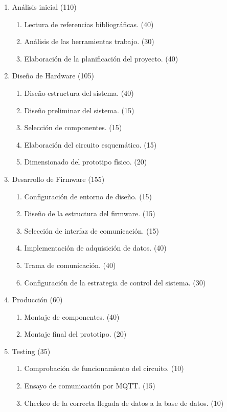 \documentclass[
11pt, %
codirector, %
]{charter}
\begin{document}
\begin{enumerate}
\item Análisis inicial (110)
	\begin{enumerate}
	\item Lectura de referencias bibliográficas. (40)
	\item Análisis de las herramientas trabajo. (30)
	\item Elaboración de la planificación del proyecto. (40)
	\end{enumerate}
\item Diseño de Hardware (105)
	\begin{enumerate}
	\item Diseño estructura del sistema. (40)
	\item Diseño preliminar del sistema. (15)
	\item Selección de componentes. (15)
	\item Elaboración del circuito esquemático. (15)
	\item Dimensionado del prototipo físico. (20)
	\end{enumerate}
\item Desarrollo de Firmware (155)
	\begin{enumerate}
	\item Configuración de entorno de diseño. (15)
	\item Diseño de la estructura del firmware. (15)
	\item Selección de interfaz de comunicación. (15)
	\item Implementación de adquisición de datos. (40)
	\item Trama de comunicación. (40)
	\item Configuración de la estrategia de control del sistema. (30)
	\end{enumerate}
\item Producción (60)
	\begin{enumerate}
	\item Montaje de componentes. (40)
	\item Montaje final del prototipo. (20)
	\end{enumerate}
\item Testing (35)
	\begin{enumerate}
	\item Comprobación de funcionamiento del circuito. (10)
	\item Ensayo de comunicación por MQTT. (15)
	\item Checkeo de la correcta llegada de datos a la base de datos. (10)

\end{enumerate}
\end{enumerate}
\end{document}
